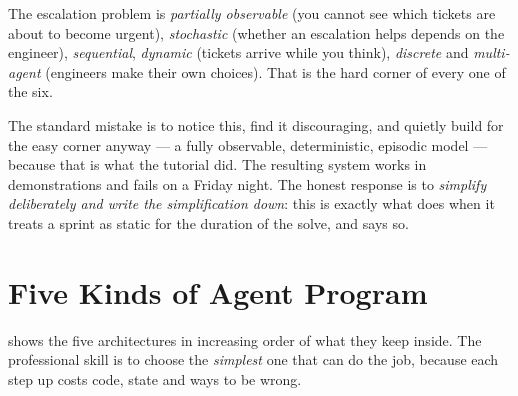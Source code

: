 \begin{alertbox}
The escalation problem is \emph{partially observable} (you cannot see which
tickets are about to become urgent), \emph{stochastic} (whether an escalation
helps depends on the engineer), \emph{sequential}, \emph{dynamic} (tickets arrive
while you think), \emph{discrete} and \emph{multi-agent} (engineers make their own
choices). That is the hard corner of every one of the six.

The standard mistake is to notice this, find it discouraging, and quietly build
for the easy corner anyway --- a fully observable, deterministic, episodic model
--- because that is what the tutorial did. The resulting system works in
demonstrations and fails on a Friday night. The honest response is to
\emph{simplify deliberately and write the simplification down}: this is exactly
what  does when it treats a sprint as static for the duration of the
solve, and says so.
\end{alertbox}

\section{Five Kinds of Agent Program}
\label{sec:agent-kinds}

 shows the five architectures in increasing order of what they
keep inside. The professional skill is to choose the \emph{simplest} one that can
do the job, because each step up costs code, state and ways to be wrong.

